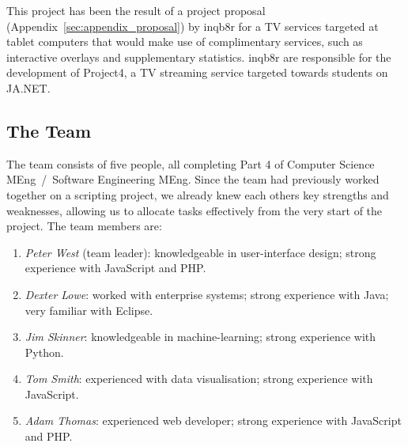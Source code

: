 


This project has been the result of a project proposal (Appendix~\ref{sec:appendix_proposal}) by inqb8r for a TV services targeted at tablet computers that would make use of complimentary services, such as interactive overlays and supplementary statistics. inqb8r are responsible for the development of Project4, a TV streaming service targeted towards students on JA.NET.

\subsection{The Team}

The team consists of five people, all completing Part 4 of Computer Science MEng~/~Software Engineering MEng. Since the team had previously worked together on a scripting project, we already knew each others key strengths and weaknesses, allowing us to allocate tasks effectively from the very start of the project. The team members are:
\begin{enumerate}
\item \textit{Peter West} (team leader): knowledgeable in user-interface design; strong experience with JavaScript and PHP.
\item \textit{Dexter Lowe}: worked with enterprise systems; strong experience with Java; very familiar with Eclipse.
\item \textit{Jim Skinner}: knowledgeable in machine-learning; strong experience with Python.
\item \textit{Tom Smith}: experienced with data visualisation; strong experience with JavaScript.
\item \textit{Adam Thomas}: experienced web developer; strong experience with JavaScript and PHP.
\end{enumerate}

